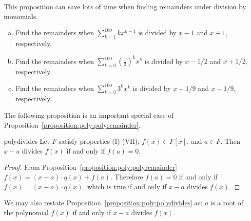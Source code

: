 This proposition can save lots of time when finding remainders under division by monomials.

\begin{exercise}{}
\begin{enumerate}[(a)]
\item
Find the remainders when $\sum_{k=1}^{100} k x^{k-1}$ is divided by $x-1$ and  $x+1$, respectively.
\item
Find the remainders when $\sum_{k=0}^{100} \left( \frac{1}{2} \right)^k x^k$ is divided by $x-1/2$ and $x+1/2$, respectively.
\item
Find the remainders when $\sum_{k=0}^{100} 3^k x^{k}$ is divided by $x+1/9$ and $x - 1/9$, respectively.
\end{enumerate}
\end{exercise}

The following proposition is an important special case of Proposition~\ref{proposition:poly:polyremainder}.

\begin{prop}{polydivides}
Let $F$ satisfy properties (I)-(VII), $f(x) \in F[x]$, and $a \in F$.  Then $x-a$ divides $f(x)$ if and only if $f(a) = 0$.
\end {prop}

\begin{proof}
From Proposition~\ref{proposition:poly:polyremainder} $f(x) = (x-a) \cdot q(x) + f(a)$. Therefore $f(a) = 0$ if and only if $f(x)=(x-a) \cdot q(x)$, which is true if and only if $x-a$ divides $f(x)$.
\end{proof}

We may also restate Proposition~\ref{proposition:poly:polydivides} as:  $a$ is a root of the polynomial $f(x)$ if and only if $x-a$ divides $f(x)$.

